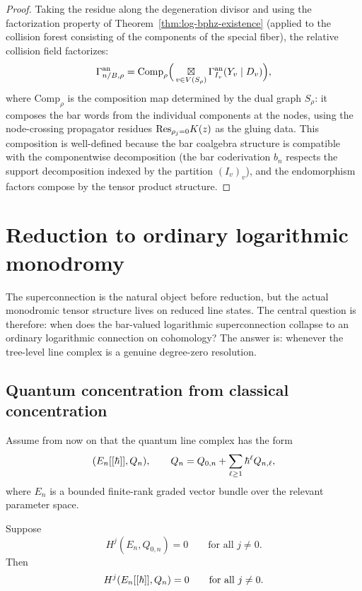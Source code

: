 \begin{proof}
Taking the residue along the degeneration divisor and using the factorization property of Theorem~\ref{thm:log-bphz-existence} (applied to the collision forest consisting of the components of the special fiber), the relative collision field factorizes:
\[
 \Gamma_{n/B,\rho}^{\mathrm{an}}
 =
 \mathrm{Comp}_\rho\Big(
 \mathop{\boxtimes}\displaylimits_{v \in V(S_\rho)} \Gamma_{I_v}^{\mathrm{an}}(Y_v \mid D_v)
 \Big),
\]
where $\mathrm{Comp}_\rho$ is the composition map determined by the dual graph $S_\rho$: it composes the bar words from the individual components at the nodes, using the node-crossing propagator residues $\mathrm{Res}_{\rho_j = 0} K(z)$ as the gluing data. This composition is well-defined because the bar coalgebra structure is compatible with the componentwise decomposition (the bar coderivation $b_n$ respects the support decomposition indexed by the partition $(I_v)_v$), and the endomorphism factors compose by the tensor product structure.
\end{proof}

\section{Reduction to ordinary logarithmic monodromy}\label{sec:reduction}

The superconnection is the natural object before reduction, but the actual monodromic tensor structure lives on reduced line states. The central question is therefore: when does the bar-valued logarithmic superconnection collapse to an ordinary logarithmic connection on cohomology? The answer is: whenever the tree-level line complex is a genuine degree-zero resolution.

\subsection{Quantum concentration from classical concentration}
Assume from now on that the quantum line complex has the form
\[
 (E_n[[\hbar]],Q_n),
 \qquad
 Q_n=Q_{0,n}+\sum_{\ell\ge 1}\hbar^\ell Q_{n,\ell},
\]
where $E_n$ is a bounded finite-rank graded vector bundle over the relevant parameter space.

\begin{theorem}\label{thm:quantum-concentration}
Suppose
\[
 H^j(E_n,Q_{0,n})=0 \qquad \text{for all } j\neq 0.
\]
Then
\[
 H^j(E_n[[\hbar]],Q_n)=0 \qquad \text{for all } j\neq 0.
\]
\end{theorem}

